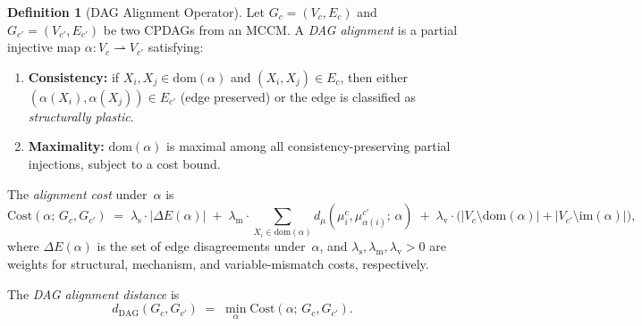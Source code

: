 \documentclass[11pt,a4paper]{article}
\theoremstyle{definition}
\newtheorem{definition}[theorem]{Definition}
\newcommand{\Dom}{\mathrm{dom}}               %
\newcommand{\Img}{\mathrm{im}}                %
\newcommand{\Cost}{\mathrm{Cost}}             %
\newcommand{\dDAG}{d_{\mathrm{DAG}}}          %
\newcommand{\dmu}{d_{\mu}}                    %
\begin{document}
\begin{definition}[DAG Alignment Operator]\label{def:dag-alignment}
Let $G_c = (V_c, E_c)$ and $G_{c'} = (V_{c'}, E_{c'})$ be two CPDAGs
from an MCCM.  A \emph{DAG alignment} is a partial injective map
$\alpha \colon V_c \rightharpoonup V_{c'}$ satisfying:
\begin{enumerate}[nosep,label=(\arabic*)]
  \item \textbf{Consistency:} if $X_i, X_j \in \Dom(\alpha)$ and
        $(X_i, X_j) \in E_c$, then either
        $(\alpha(X_i), \alpha(X_j)) \in E_{c'}$ (edge preserved) or the
        edge is classified as \emph{structurally plastic}.
  \item \textbf{Maximality:} $\Dom(\alpha)$ is maximal among all
        consistency-preserving partial injections, subject to a cost bound.
\end{enumerate}
The \emph{alignment cost} under~$\alpha$ is
\begin{equation}\label{eq:alignment-cost}
  \Cost(\alpha;\, G_c, G_{c'})
  \;=\;
  \lambda_{\mathrm{s}} \cdot |\Delta E(\alpha)|
  \;+\;
  \lambda_{\mathrm{m}} \cdot
    \sum_{X_i \in \Dom(\alpha)} \dmu(\mu_i^c, \mu_{\alpha(i)}^{c'};\, \alpha)
  \;+\;
  \lambda_{\mathrm{v}} \cdot
    \bigl(|V_c \setminus \Dom(\alpha)| + |V_{c'} \setminus \Img(\alpha)|\bigr),
\end{equation}
where $\Delta E(\alpha)$ is the set of edge disagreements under~$\alpha$,
and $\lambda_{\mathrm{s}}, \lambda_{\mathrm{m}}, \lambda_{\mathrm{v}} > 0$
are weights for structural, mechanism, and variable-mismatch costs,
respectively.

The \emph{DAG alignment distance} is
\[
  \dDAG(G_c, G_{c'})
  \;=\;
  \min_{\alpha} \Cost(\alpha;\, G_c, G_{c'}).
\]
\end{definition}
\end{document}
